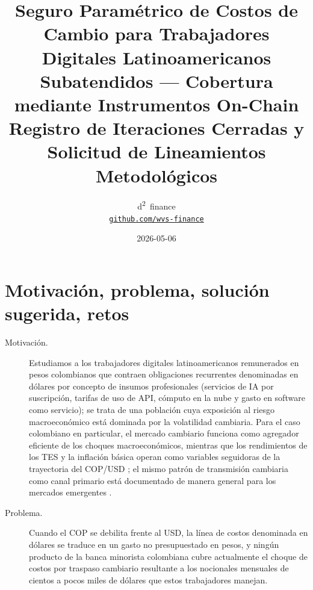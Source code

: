 \documentclass[11pt,a4paper]{article}
\title{Seguro Paramétrico de Costos de Cambio para Trabajadores Digitales Latinoamericanos Subatendidos --- Cobertura mediante Instrumentos On-Chain \\[0.5em]
\large Registro de Iteraciones Cerradas y Solicitud de Lineamientos Metodológicos}
\author{d\textsuperscript{2}~finance \\ \href{https://github.com/wvs-finance}{\texttt{github.com/wvs-finance}}}
\date{2026-05-06}
\theoremstyle{plain}
\begin{document}
\maketitle
\thispagestyle{empty}

\section{Motivación, problema, solución sugerida, retos}\label{sec:1}

\begin{description}
  \item[Motivación.] Estudiamos a los trabajadores digitales latinoamericanos remunerados en pesos colombianos que contraen obligaciones recurrentes denominadas en dólares por concepto de insumos profesionales (servicios de IA por suscripción, tarifas de uso de API, cómputo en la nube y gasto en software como servicio); se trata de una población cuya exposición al riesgo macroeconómico está dominada por la volatilidad cambiaria. Para el caso colombiano en particular, el mercado cambiario funciona como agregador eficiente de los choques macroeconómicos, mientras que los rendimientos de los TES y la inflación básica operan como variables seguidoras de la trayectoria del COP/USD \citep{rincontorresInterdependenceFXTreasury2021,rincontorresLowFrequencyEffectMacroNews2023,rinconcastroTraspasoTasaCambio2021,fuentesIntradayExchangeRate2014}; el mismo patrón de transmisión cambiaria como canal primario está documentado de manera general para los mercados emergentes \citep{calvo_reinhart_2002,rey_2015,bruno_shin_2015}.
  \item[Problema.] Cuando el COP se debilita frente al USD, la línea de costos denominada en dólares se traduce en un gasto no presupuestado en pesos, y ningún producto de la banca minorista colombiana cubre actualmente el choque de costos por traspaso cambiario resultante a los nocionales mensuales de cientos a pocos miles de dólares que estos trabajadores manejan.

\end{description}
\end{document}
